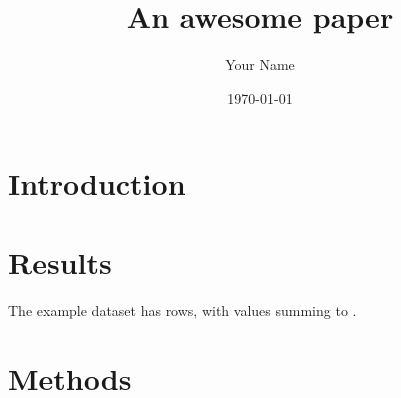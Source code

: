\documentclass[12pt]{article} %
\begin{document}

\title{An awesome paper} %
\author{Your Name}
\date{\today}
\maketitle %

\section{Introduction}\label{sec:introduction} %



\section{Results}\label{sec:results} %

The example dataset has \nExampleRows{} rows, with values summing to \exampleValueTotal{}.



\section{Methods}\label{sec:methods} %


\printbibliography{}
    
\end{document}

